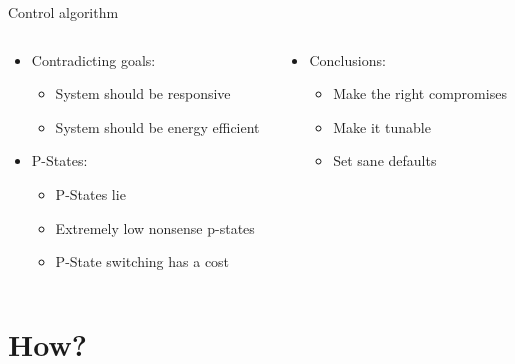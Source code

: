 \documentclass[aspectratio=169]{beamer}
\begin{document}
\begin{frame}{Control algorithm}
\begin{columns}[onlytextwidth]
\begin{column}{0.6\textwidth}
\begin{itemize}
\item Contradicting goals: \begin{itemize}
      \item<2-> System should be responsive
      \item<3-> System should be energy efficient
      \end{itemize}
\item<4-> P-States: \begin{itemize}
      \item<5-> P-States lie
      \item<6-> Extremely low nonsense p-states
      \item<7-> P-State switching has a cost
      \end{itemize}
\end{itemize}
\end{column}
\begin{column}{0.4\textwidth}
\begin{itemize}
\item<8-> Conclusions: \begin{itemize}
      \item<9-> Make the right compromises
      \item<10-> Make it tunable
      \item<11-> Set sane defaults
      \end{itemize}
\end{itemize}
\end{column}
\end{columns}
\end{frame}

\section{How?}
\end{document}
